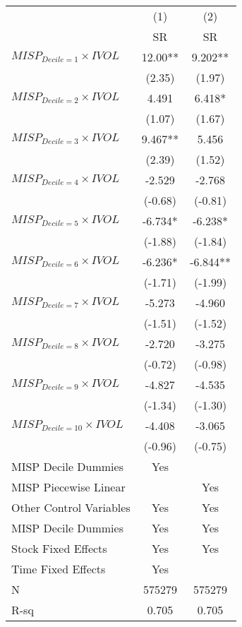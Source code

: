 \begin{tabular}{lcc}
\toprule
        & (1)     & (2) \\
        & SR      & SR \\
\midrule
$MISP_{Decile = 1} \times IVOL$ & 12.00** & 9.202** \\
        & (2.35)  & (1.97) \\
$MISP_{Decile = 2} \times IVOL$ & 4.491   & 6.418* \\
        & (1.07)  & (1.67) \\
$MISP_{Decile = 3} \times IVOL$ & 9.467** & 5.456 \\
        & (2.39)  & (1.52) \\
$MISP_{Decile = 4} \times IVOL$ & -2.529  & -2.768 \\
        & (-0.68) & (-0.81) \\
$MISP_{Decile = 5} \times IVOL$ & -6.734* & -6.238* \\
        & (-1.88) & (-1.84) \\
$MISP_{Decile = 6} \times IVOL$ & -6.236* & -6.844** \\
        & (-1.71) & (-1.99) \\
$MISP_{Decile = 7} \times IVOL$ & -5.273  & -4.960 \\
        & (-1.51) & (-1.52) \\
$MISP_{Decile = 8} \times IVOL$ & -2.720  & -3.275 \\
        & (-0.72) & (-0.98) \\
$MISP_{Decile = 9} \times IVOL$ & -4.827  & -4.535 \\
        & (-1.34) & (-1.30) \\
$MISP_{Decile = 10} \times IVOL$ & -4.408  & -3.065 \\
        & (-0.96) & (-0.75) \\
\midrule
MISP Decile Dummies & Yes     &  \\
MISP Piecewise Linear &         & Yes \\
Other Control Variables & Yes     & Yes \\
MISP Decile Dummies & Yes     & Yes \\
Stock Fixed Effects & Yes     & Yes \\
Time Fixed Effects & Yes     &  \\
N       & 575279  & 575279 \\
R-sq    & 0.705   & 0.705 \\
\bottomrule
\end{tabular}%
